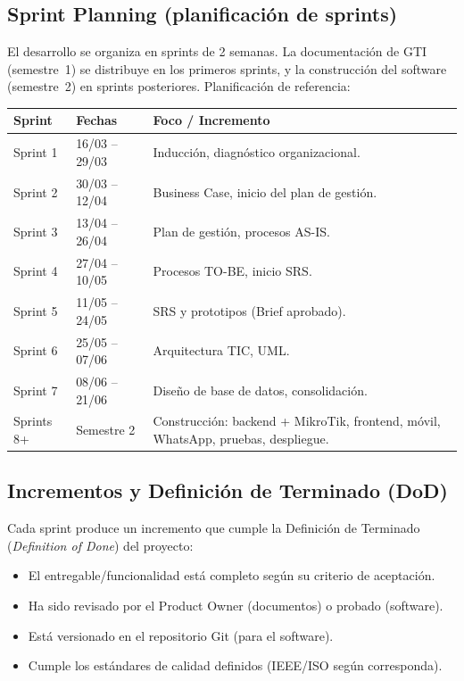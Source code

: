 \subsection{Sprint Planning (planificación de sprints)}

El desarrollo se organiza en sprints de 2 semanas. La documentación de GTI (semestre~1)
se distribuye en los primeros sprints, y la construcción del software (semestre~2) en
sprints posteriores. Planificación de referencia:

\begin{center}
\label{tab:sprints}
\begin{tabularx}{\textwidth}{L{2.2cm} L{2.8cm} X}
\toprule
\textbf{Sprint} & \textbf{Fechas} & \textbf{Foco / Incremento} \\
\midrule
Sprint 1 & 16/03 -- 29/03 & Inducción, diagnóstico organizacional. \\
Sprint 2 & 30/03 -- 12/04 & Business Case, inicio del plan de gestión. \\
Sprint 3 & 13/04 -- 26/04 & Plan de gestión, procesos AS-IS. \\
Sprint 4 & 27/04 -- 10/05 & Procesos TO-BE, inicio SRS. \\
Sprint 5 & 11/05 -- 24/05 & SRS y prototipos (Brief aprobado). \\
Sprint 6 & 25/05 -- 07/06 & Arquitectura TIC, UML. \\
Sprint 7 & 08/06 -- 21/06 & Diseño de base de datos, consolidación. \\
Sprints 8+ & Semestre 2 & Construcción: backend + MikroTik, frontend, móvil, WhatsApp,
pruebas, despliegue. \\
\bottomrule
\end{tabularx}
\end{center}

\subsection{Incrementos y Definición de Terminado (DoD)}

Cada sprint produce un incremento que cumple la Definición de Terminado
(\textit{Definition of Done}) del proyecto:

\begin{itemize}[leftmargin=1.4em]
  \item El entregable/funcionalidad está completo según su criterio de aceptación.
  \item Ha sido revisado por el Product Owner (documentos) o probado (software).
  \item Está versionado en el repositorio Git (para el software).
  \item Cumple los estándares de calidad definidos (IEEE/ISO según corresponda).
\end{itemize}

